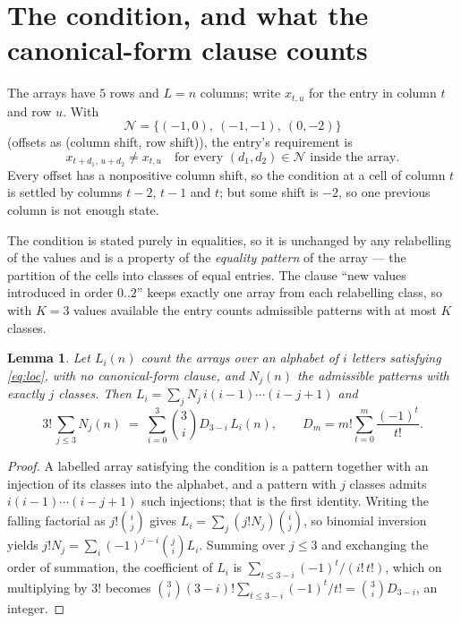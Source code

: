 \documentclass[11pt,a4paper]{article}
\theoremstyle{plain}
\newtheorem{lemma}[theorem]{Lemma}
\theoremstyle{definition}
\begin{document}
\section{The condition, and what the canonical-form clause counts}

The arrays have $5$ rows and $L=n$ columns; write $x_{t,u}$ for the entry in
column $t$ and row $u$. With
\[
\mathcal N=\{(-1,0),\ (-1,-1),\ (0,-2)\}
\]
(offsets as (column shift, row shift)), the entry's requirement is
\begin{equation}\label{eq:loc}
x_{t+d_1,\,u+d_2}\ne x_{t,u}\quad\text{for every }(d_1,d_2)\in\mathcal N\text{ inside the array}.
\end{equation}
Every offset has a nonpositive column shift, so the condition at a cell of column $t$ is
settled by columns $t-2$, $t-1$ and $t$; but some shift is $-2$, so one previous column is not
enough state.

The condition is stated purely in equalities, so it is unchanged by any relabelling of the
values and is a property of the \emph{equality pattern} of the array --- the partition of
the cells into classes of equal entries. The clause ``new values introduced in order
$0..2$'' keeps exactly one array from each relabelling class, so with $K=3$ values
available the entry counts admissible patterns with at most $K$ classes.

\begin{lemma}\label{lem:inv}
Let $L_i(n)$ count the arrays over an alphabet of $i$ letters satisfying \eqref{eq:loc},
with no canonical-form clause, and $N_j(n)$ the admissible patterns with exactly $j$ classes.
Then $L_i=\sum_j N_j\,i(i-1)\cdots(i-j+1)$ and
\[
3!\,\sum_{j\le 3}N_j(n)\;=\;\sum_{i=0}^{3}\binom{3}{i}D_{3-i}\,L_i(n),
\qquad D_m=m!\sum_{t=0}^{m}\frac{(-1)^t}{t!} .
\]
\end{lemma}

\begin{proof}
A labelled array satisfying the condition is a pattern together with an injection of its
classes into the alphabet, and a pattern with $j$ classes admits $i(i-1)\cdots(i-j+1)$ such
injections; that is the first identity. Writing the falling factorial as $j!\binom{i}{j}$
gives $L_i=\sum_j(j!N_j)\binom{i}{j}$, so binomial inversion yields
$j!N_j=\sum_i(-1)^{j-i}\binom{j}{i}L_i$. Summing over $j\le3$ and exchanging the
order of summation, the coefficient of $L_i$ is $\sum_{t\le3-i}(-1)^t/(i!\,t!)$, which on
multiplying by $3!$ becomes
$\binom{3}{i}(3-i)!\sum_{t\le3-i}(-1)^t/t!=\binom{3}{i}D_{3-i}$, an
integer.
\end{proof}
\end{document}
